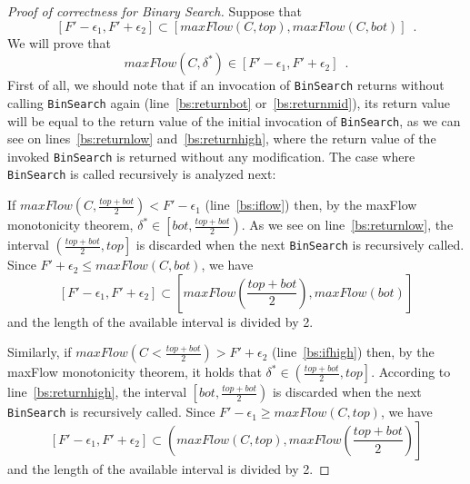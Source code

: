 \begin{proof}[Proof of correctness for Binary Search]
  Suppose that
  \begin{equation*}
    \left[F' - \epsilon_1, F' + \epsilon_2\right] \subset \left[maxFlow\left(C, top\right), maxFlow\left(C, bot\right)\right]
    \enspace.
  \end{equation*}
  We will prove that
  \begin{equation*}
    maxFlow\left(C, \delta^*\right) \in \left[F' - \epsilon_1, F' + \epsilon_2\right] \enspace.
  \end{equation*}
  First of all, we should note that if an invocation of \texttt{BinSearch} returns without calling \texttt{BinSearch} again
  (line~\ref{bs:returnbot} or~\ref{bs:returnmid}), its return value will be equal to the return value of the initial
  invocation of \texttt{BinSearch}, as we can see on lines~\ref{bs:returnlow} and~\ref{bs:returnhigh}, where the return
  value of the invoked \texttt{BinSearch} is returned without any modification. The case where \texttt{BinSearch} is called
  recursively is analyzed next:

  If $maxFlow\left(C, \frac{top+bot}{2}\right) < F' - \epsilon_1$ (line~\ref{bs:iflow}) then, by the maxFlow monotonicity
  theorem, $\delta^* \in \left[bot,\frac{top+bot}{2}\right)$. As we see on line~\ref{bs:returnlow}, the interval
  $\left(\frac{top+bot}{2}, top\right]$ is discarded when the next \texttt{BinSearch} is recursively called. Since
  $F' + \epsilon_2 \leq maxFlow\left(C, bot\right)$, we have
  \begin{equation*}
    \left[F' - \epsilon_1, F' + \epsilon_2\right] \subset \left[maxFlow\left(\frac{top+bot}{2}\right),
    maxFlow\left(bot\right)\right]
  \end{equation*}
  and the length of the available interval is divided by 2.

  Similarly, if $maxFlow\left(C< \frac{top+bot}{2}\right) > F' + \epsilon_2$ (line~\ref{bs:ifhigh}) then, by the maxFlow
  monotonicity theorem, it holds that $\delta^* \in \left(\frac{top+bot}{2}, top\right]$. According to
  line~\ref{bs:returnhigh}, the interval $\left[bot, \frac{top+bot}{2}\right)$ is discarded when the next
  \texttt{BinSearch} is recursively called. Since $F'- \epsilon_1 \geq maxFlow\left(C, top\right)$, we have
  \begin{equation*}
    \left[F' - \epsilon_1, F' + \epsilon_2\right] \subset \left(maxFlow\left(C, top\right),
    maxFlow\left(\frac{top+bot}{2}\right)\right]
  \end{equation*}
  and the length of the available interval is divided by 2.


\end{proof}

